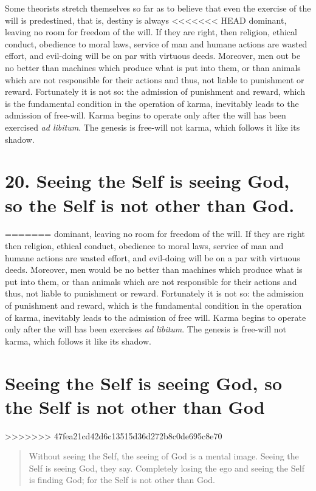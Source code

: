 \documentclass[12pt]{report}
\begin{document}
Some theorists stretch themselves so far as to believe that even the
exercise of the will is predestined, that is, destiny is always
<<<<<<< HEAD
dominant, leaving no room for freedom of the will. If they are right,
then religion, ethical conduct, obedience to moral laws, service of
man and humane actions are wasted effort, and evil-doing will be on
par with virtuous deeds. Moreover, men out be no better than machines
which produce what is put into them, or than animals which are not
responsible for their actions and thus, not liable to punishment or
reward. Fortunately it is not so: the admission of punishment and
reward, which is the fundamental condition in the operation of karma,
inevitably leads to the admission of free-will. Karma begins to
operate only after the will has been exercised \emph{ad libitum}. The
genesis is free-will not karma, which follows it like its shadow.

\section{20. Seeing the Self is seeing God, so the Self is not other
  than God.}
=======
dominant, leaving no room for freedom of the will. If they are right
then religion, ethical conduct, obedience to moral laws, service of
man and humane actions are wasted effort, and evil-doing will be on a
par with virtuous deeds. Moreover, men would be no better than
machines which produce what is put into them, or than animals which
are not responsible for their actions and thus, not liable to
punishment or reward. Fortunately it is not so: the admission of
punishment and reward, which is the fundamental condition in the
operation of karma, inevitably leads to the admission of free
will. Karma begins to operate only after the will has been exercises
\emph{ad libitum}. The genesis is free-will not karma, which follows
it like its shadow.

\section{ Seeing the Self is seeing God, so the Self is not other than
God }
>>>>>>> 47fea21cd42d6c13515d36d272b8c0de695c8e70

\begin{quote}
Without seeing the Self, the seeing of God is a mental image. Seeing
the Self is seeing God, they say. Completely losing the ego and seeing
the Self is finding God; for the Self is not other than God.
\end{quote}
\end{document}

